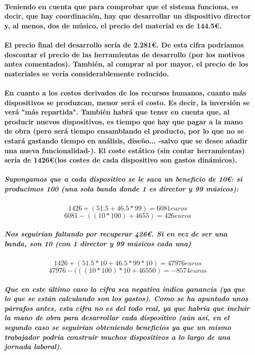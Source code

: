 \paragraph{
Teniendo en cuenta que para comprobar que el sistema funciona, es decir, que hay
coordinación, hay que desarrollar un dispositivo director y,  al menos, dos de músico,
el precio del material es de 144.5\euro.
}

\paragraph{
El precio final del desarrollo sería de \textbf{2.281\euro}. De esta cifra podríamos
descontar el precio de las herramientas de desarrollo (por los motivos antes comentados).
También, al comprar al por mayor, el precio de los materiales se vería considerablemente
reducido.
}

\paragraph{
En cuanto a los costos derivados de los recursos humanos, cuanto más dispositivos se produzcan,
menor será el costo. Es decir, la inversión se verá "más repartida". También habrá que tener en
cuenta que, al producir nuevos dispositivos, es tiempo que hay que pagar a la mano de obra
(pero será tiempo ensamblando el producto, por lo que no se estará gastando tiempo en análisis,
diseño... -salvo que se desee añadir una nueva funcionalidad-). El coste estático (sin contar herramientas)
sería de 1426\euro (los costes de cada dispositivo son gastos dinámicos).
}

\subparagraph{
Supongamos que a cada dispositivo se le saca un beneficio de 10\euro: si producimos 100
(una sola banda donde 1 es director y 99 músicos):
}
\[
  1426 + (51.5+46.5*99) = 6081 euros
\]
\[
  6081 - ((10*100)+4655) = 426 euros
\]

\subparagraph{
Nos seguirían faltando por recuperar 426\euro. Si en vez de ser una banda, son 10 (con 1 director y 99 músicos cada una)
}

\[
  1426 + (51.5*10+46.5*99*10) = 47976 euros
\]
\[
  47976 - (((10*100)*10+46550) = -8574 euros
\]

\subparagraph{
Que en este último caso la cifra sea negativa indica ganancia (ya que lo que se están
calculando son los gastos). Como se ha apuntado unos párrafos antes, esta cifra no es
del todo real, ya que habría que incluir la mano de obra para desarrollar cada dispositivo
(aún así, en el segundo caso se seguirían obteniendo beneficios ya que un mismo trabajador
podría construir muchos dispositivos a lo largo de una jornada laboral).
}
